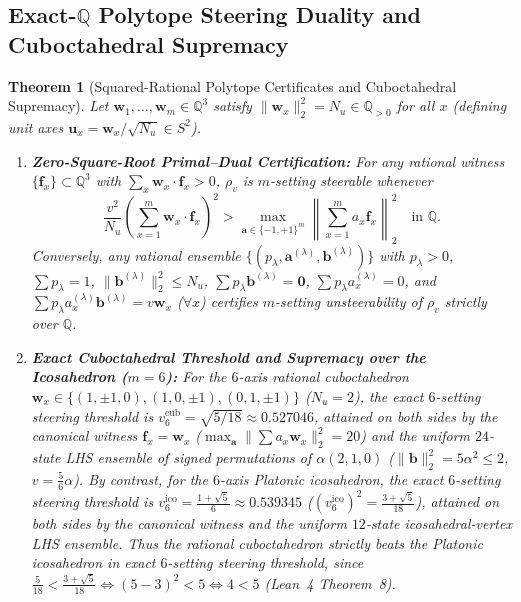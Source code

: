 \documentclass[11pt,a4paper]{article}
\newtheorem{theorem}{Theorem}[section]
\theoremstyle{definition}
\theoremstyle{remark}
\newcommand{\QQ}{\mathbb{Q}}
\begin{document}
\subsection{Exact-\texorpdfstring{$\QQ$}{Q} Polytope Steering Duality and Cuboctahedral Supremacy}

\begin{theorem}[Squared-Rational Polytope Certificates and Cuboctahedral Supremacy]\label{thm:polytope}
Let $\mathbf{w}_1,\dots,\mathbf{w}_m \in \QQ^3$ satisfy $\|\mathbf{w}_x\|_2^2 = N_u \in \QQ_{>0}$ for all $x$ (defining unit axes $\mathbf{u}_x = \mathbf{w}_x / \sqrt{N_u} \in S^2$).
\begin{enumerate}[leftmargin=1.8em,itemsep=2pt]
  \item \textbf{Zero-Square-Root Primal--Dual Certification:} For any rational witness $\{\mathbf{f}_x\} \subset \QQ^3$ with $\sum_x \mathbf{w}_x\cdot\mathbf{f}_x > 0$, $\rho_v$ is $m$-setting steerable whenever
  \begin{equation}\label{eq:sq-witness}
    \frac{v^2}{N_u}\!\left(\sum_{x=1}^m \mathbf{w}_x\cdot\mathbf{f}_x\right)^2 > \max_{\mathbf{a}\in\{-1,+1\}^m}\left\|\sum_{x=1}^m a_x \mathbf{f}_x\right\|_2^2 \quad\text{in }\QQ.
  \end{equation}
  Conversely, any rational ensemble $\{(p_\lambda, \mathbf{a}^{(\lambda)}, \mathbf{b}^{(\lambda)})\}$ with $p_\lambda > 0$, $\sum p_\lambda = 1$, $\|\mathbf{b}^{(\lambda)}\|_2^2 \le N_u$, $\sum p_\lambda \mathbf{b}^{(\lambda)} = \mathbf{0}$, $\sum p_\lambda a_x^{(\lambda)} = 0$, and $\sum p_\lambda a_x^{(\lambda)} \mathbf{b}^{(\lambda)} = v\mathbf{w}_x$ ($\forall x$) certifies $m$-setting unsteerability of $\rho_v$ strictly over $\QQ$.
  \item \textbf{Exact Cuboctahedral Threshold and Supremacy over the Icosahedron ($m=6$):} For the $6$-axis rational cuboctahedron $\mathbf{w}_x \in \{(1,\pm 1,0),(1,0,\pm 1),(0,1,\pm 1)\}$ ($N_u = 2$), the exact $6$-setting steering threshold is $v_6^{\mathrm{cub}} = \sqrt{5/18} \approx 0.527046$, attained on both sides by the canonical witness $\mathbf{f}_x = \mathbf{w}_x$ ($\max_{\mathbf{a}}\|\sum a_x\mathbf{w}_x\|_2^2 = 20$) and the uniform $24$-state LHS ensemble of signed permutations of $\alpha(2,1,0)$ ($\|\mathbf{b}\|_2^2 = 5\alpha^2 \le 2$, $v = \frac{5}{6}\alpha$). By contrast, for the $6$-axis Platonic icosahedron, the exact $6$-setting steering threshold is $v_6^{\mathrm{ico}} = \frac{1+\sqrt{5}}{6} \approx 0.539345$ ($(v_6^{\mathrm{ico}})^2 = \frac{3+\sqrt{5}}{18}$), attained on both sides by the canonical witness and the uniform $12$-state icosahedral-vertex LHS ensemble. Thus the rational cuboctahedron strictly beats the Platonic icosahedron in exact $6$-setting steering threshold, since $\frac{5}{18} < \frac{3+\sqrt{5}}{18} \iff (5-3)^2 < 5 \iff 4 < 5$ (Lean~4 Theorem~8).
\end{enumerate}
\end{theorem}
\end{document}
